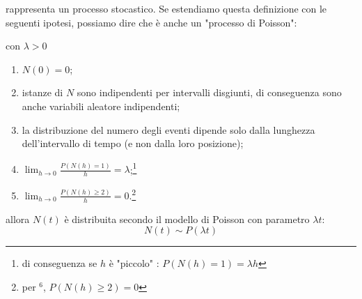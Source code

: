 	rappresenta un processo stocastico. Se estendiamo questa definizione con le seguenti ipotesi, possiamo dire che è anche un "processo di Poisson":\begin{center} con $\lambda > 0$
	\end{center}
	\begin{enumerate}
		\item $N(0)=0$;
		\item istanze di $N$ sono indipendenti per intervalli disgiunti, di conseguenza sono anche variabili aleatore indipendenti;
		\item la distribuzione del numero degli eventi dipende solo dalla lunghezza dell'intervallo di tempo (e non dalla loro posizione);
		\item $\displaystyle\lim_{h\to0}\frac{P(N(h)=1)}{h}=\lambda$;\footnote{di conseguenza se $h$ è "piccolo" : $P(N(h) = 1) = \lambda h$}
		\item $\displaystyle\lim_{h\to0}\frac{P(N(h)\geq 2)}{h}=0$.\footnote{per $^6$, $P(N(h) \geq 2) = 0$}


	\end{enumerate}
	allora $N(t)$ è distribuita secondo il modello di Poisson con parametro $\lambda t$:
	\begin{equation*}
		N(t)\sim P(\lambda t)
	\end{equation*}

